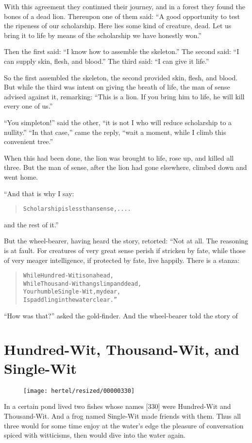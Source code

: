\documentclass[article, twoside, 10pt]{memoir}
\renewenvironment{verbatim}{%
\begin{quote}%
\vskip -10pt%
\begin{alltt}\normalfont\small}{\end{alltt}%
\end{quote}%
\vskip -10pt
} %
\begin{document}
With this agreement they continued their journey, and in a forest
they found the bones of a dead lion. Thereupon one of them said:
``A good opportunity to test the ripeness of our scholarship. Here lies some kind of creature, dead. Let us bring it to life by means of the scholarship we have honestly won.''

Then the first said: ``I know how to assemble the skeleton.'' The
second said: ``I can supply skin, flesh, and blood.'' The third
said: ``I can give it life.''

So the first assembled the skeleton, the second provided skin,
flesh, and blood. But while the third was intent on giving the
breath of life, the man of sense advised against it, remarking:
``This is a lion. If you bring him to life, he will kill every one of us.''

``You simpleton!'' said the other,
``it is not I who will reduce scholarship to a nullity.''
``In that case,'' came the reply,
``wait a moment, while I climb this convenient tree.''

When this had been done, the lion was brought to life, rose up, and
killed all three. But the man of sense, after the lion had gone
elsewhere, climbed down and went home.

“And that is why I say:

\begin{verbatim}
Scholarship is less than sense, ....
\end{verbatim}
and the rest of it.”

But the wheel-bearer, having heard the story, retorted: “Not at
all. The reasoning is at fault. For creatures of very great sense
perish if stricken by fate, while those of very meager
intelligence, if protected by fate, live happily. There is a
stanza:

\begin{verbatim}
While Hundred-Wit is on a head,
While Thousand-Wit hangs limp and dead,
Your humble Single-Wit, my dear,
Is paddling in the water clear.”
\end{verbatim}
``How was that?'' asked the gold-finder. And the wheel-bearer told
the story of

\chapter{Hundred-Wit, Thousand-Wit, and Single-Wit}

\begin{figure}[p]\texttt{[image: hertel/resized/00000330]}\end{figure}In a certain pond lived two fishes whose names [330] were
Hundred-Wit and Thousand-Wit. And a frog named Single-Wit made
friends with them. Thus all three would for some time enjoy at the
water's edge the pleasure of conversation spiced with witticisms,
then would dive into the water again.
\end{document}
